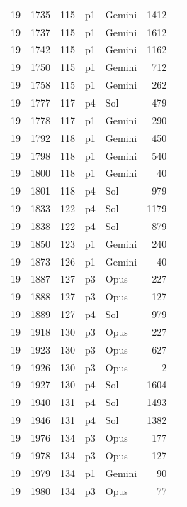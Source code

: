 \begin{longtable}{r r r l l r L{2.3in}}
19 & 1735 & 115 & p1 & Gemini & 1412 &  \\
19 & 1737 & 115 & p1 & Gemini & 1612 &  \\
19 & 1742 & 115 & p1 & Gemini & 1162 &  \\
19 & 1750 & 115 & p1 & Gemini & 712 &  \\
19 & 1758 & 115 & p1 & Gemini & 262 &  \\
19 & 1777 & 117 & p4 & Sol & 479 &  \\
19 & 1778 & 117 & p1 & Gemini & 290 &  \\
19 & 1792 & 118 & p1 & Gemini & 450 &  \\
19 & 1798 & 118 & p1 & Gemini & 540 &  \\
19 & 1800 & 118 & p1 & Gemini & 40 &  \\
19 & 1801 & 118 & p4 & Sol & 979 &  \\
19 & 1833 & 122 & p4 & Sol & 1179 &  \\
19 & 1838 & 122 & p4 & Sol & 879 &  \\
19 & 1850 & 123 & p1 & Gemini & 240 &  \\
19 & 1873 & 126 & p1 & Gemini & 40 &  \\
19 & 1887 & 127 & p3 & Opus & 227 &  \\
19 & 1888 & 127 & p3 & Opus & 127 &  \\
19 & 1889 & 127 & p4 & Sol & 979 &  \\
19 & 1918 & 130 & p3 & Opus & 227 &  \\
19 & 1923 & 130 & p3 & Opus & 627 &  \\
19 & 1926 & 130 & p3 & Opus & 2 &  \\
19 & 1927 & 130 & p4 & Sol & 1604 &  \\
19 & 1940 & 131 & p4 & Sol & 1493 &  \\
19 & 1946 & 131 & p4 & Sol & 1382 &  \\
19 & 1976 & 134 & p3 & Opus & 177 &  \\
19 & 1978 & 134 & p3 & Opus & 127 &  \\
19 & 1979 & 134 & p1 & Gemini & 90 &  \\
19 & 1980 & 134 & p3 & Opus & 77 &  \\

\end{longtable}
